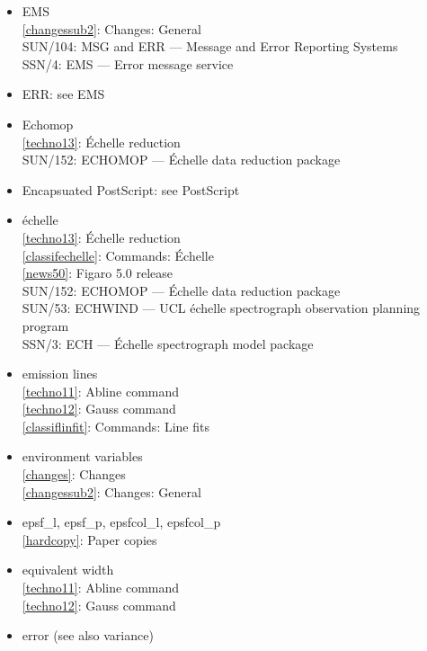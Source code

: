 \documentclass[11pt,twoside]{article}
\newcommand{\htmlref}[2]{#1}
\newcommand{\xref}[3]{#1}
\newcommand{\idxint}[2]{\ref{#1}: \htmlref{#2}{#1}}
\newcommand{\idxint}[2]{\htmlref{#2}{#1}}
\newcommand{\latorhtm}[2]{#1}
\newcommand{\latorhtm}[2]{#2}
\begin{document}
\begin{itemize}
\item EMS\\
   \idxint{changessub2}{Changes: General}\\
   \xref{SUN/104: MSG and ERR \latorhtm{---}{-} Message and Error Reporting Systems}{sun104}{}\\
   \xref{SSN/4: EMS \latorhtm{---}{-} Error message service}{ssn4}{}
\item ERR: see EMS
\item Echomop\\
   \idxint{techno13}{\'Echelle reduction}\\
   \xref{SUN/152: ECHOMOP \latorhtm{---}{-} \'Echelle data reduction package}{sun152}{}
\item Encapsuated PostScript: see PostScript
\item \'echelle\\
   \idxint{techno13}{\'Echelle reduction}\\
   \idxint{classifechelle}{Commands: \'Echelle}\\
   \idxint{news50}{Figaro 5.0 release}\\
   \xref{SUN/152: ECHOMOP \latorhtm{---}{-} \'Echelle data reduction package}{sun152}{}\\
   \xref{SUN/53: ECHWIND \latorhtm{---}{-} UCL \'echelle spectrograph observation
      planning program}{sun53}{} \\
   \xref{SSN/3: ECH \latorhtm{---}{-} \'Echelle spectrograph model package}{ssn3}{}
\item emission lines\\
   \idxint{techno11}{Abline command}\\
   \idxint{techno12}{Gauss command}\\
   \idxint{classiflinfit}{Commands: Line fits}
\item environment variables\\
   \idxint{changes}{Changes}\\
   \idxint{changessub2}{Changes: General}
\item epsf\_l, epsf\_p, epsfcol\_l, epsfcol\_p\\
   \idxint{hardcopy}{Paper copies}
\item equivalent width\\
   \idxint{techno11}{Abline command}\\
   \idxint{techno12}{Gauss command}
\item error (see also variance)\\

\end{itemize}
\end{document}
